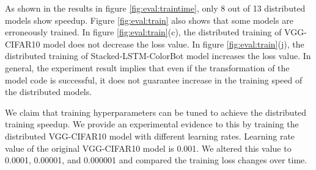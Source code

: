 As shown in the results in figure \ref{fig:eval:traintime},
only 8 out of 13 distributed models show speedup. 
Figure \ref{fig:eval:train} also shows that some models are erroneously trained.
In figure \ref{fig:eval:train}(c), the distributed training of
VGG-CIFAR10 model does not decrease the loss value.
In figure \ref{fig:eval:train}(j), the distributed training of
Stacked-LSTM-ColorBot model increases the loss value.
In general, the experiment result implies that even if the transformation
of the model code is successful, it does not guarantee
increase in the training speed of the distributed models.

We claim that training hyperparameters can be tuned to
achieve the distributed training speedup.
We provide an experimental evidence to this by
training the distributed VGG-CIFAR10 model with
different learning rates.
Learning rate value of the original VGG-CIFAR10 model is 0.001.
We altered this value to 0.0001, 0.00001, and 0.000001
and compared the training loss changes over time.

